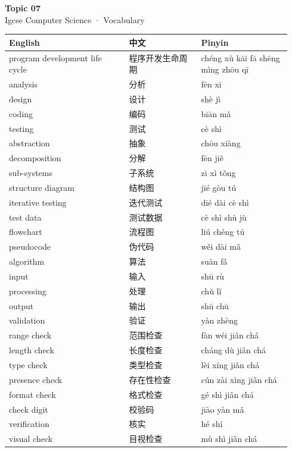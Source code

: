 \documentclass[11pt]{article}
\begin{document}
\begin{center}
  {\LARGE\bfseries Topic 07}\\[0.35em]
  {\large Igcse Computer Science · Vocabulary}
\end{center}
\vspace{0.6em}

\begin{longtable}{@{}p{0.40\linewidth}p{0.24\linewidth}p{0.30\linewidth}@{}}
\toprule
\textbf{English} & \textbf{中文} & \textbf{Pinyin} \\
\midrule
\endhead
\bottomrule
\endlastfoot
program development life cycle & 程序开发生命周期 & chéng xù kāi fā shēng mìng zhōu qī \\
analysis & 分析 & fēn xī \\
design & 设计 & shè jì \\
coding & 编码 & biān mǎ \\
testing & 测试 & cè shì \\
abstraction & 抽象 & chōu xiàng \\
decomposition & 分解 & fēn jiě \\
sub-systems & 子系统 & zi xì tǒng \\
structure diagram & 结构图 & jié gòu tú \\
iterative testing & 迭代测试 & dié dài cè shì \\
test data & 测试数据 & cè shì shù jù \\
flowchart & 流程图 & liú chéng tú \\
pseudocode & 伪代码 & wěi dài mǎ \\
algorithm & 算法 & suàn fǎ \\
input & 输入 & shū rù \\
processing & 处理 & chǔ lǐ \\
output & 输出 & shū chū \\
validation & 验证 & yàn zhèng \\
range check & 范围检查 & fàn wéi jiǎn chá \\
length check & 长度检查 & cháng dù jiǎn chá \\
type check & 类型检查 & lèi xíng jiǎn chá \\
presence check & 存在性检查 & cún zài xìng jiǎn chá \\
format check & 格式检查 & gé shì jiǎn chá \\
check digit & 校验码 & jiào yàn mǎ \\
verification & 核实 & hé shí \\
visual check & 目视检查 & mù shì jiǎn chá \\

\end{longtable}
\end{document}

